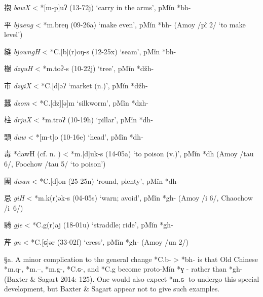 \begin{description} \item
抱  \emph{bawX} \textless{} *[m-p]{}uʔ (13-72j) `carry in the arms',
pMǐn *bh-
\item
平  \emph{bjaeng} \textless{} *m.breŋ (09-26a) `make even', pMǐn *bh-
(Amoy /p{}ĩ 2/ `to make level')
\item
縫  \emph{bjowngH} \textless{} *C.{[}b](r)oŋ-s (12-25x) `seam', pMǐn
*bh-
\item
樹 \emph{dzyuH} \textless{} *m.toʔ-s (10-22j) `tree', pMǐn *džh-
\item
市 \emph{dzyiX} \textless{} *C.{[}d]əʔ `market (n.)', pMǐn *džh-

\item
蠶 \emph{dzom} \textless{} *C.{[}dz]{}{[}ə]m `silkworm', pMǐn *dzh-

\item
柱 \emph{drjuX} \textless{} *m.troʔ (10-19h) `pillar', pMǐn *dh-

\item
頭 \emph{duw} \textless{} *[m-t]{}o (10-16e) `head', pMǐn *dh-

\item
毒 *dawH (cf. n. ) \textless{} *m.{[}d]{}uk-s (14-05a) `to poison
(v.)', pMǐn *dh (Amoy /t{}au 6/, Foochow /t{}au 5/ `to poison')

\item
團 \emph{dwan} \textless{} *C.{[}d]{}on (25-25n) `round, plenty', pMǐn
*dh-

\item
忌 \emph{giH} \textless{} *m.k(r)ək-s (04-05s) `warn; avoid', pMǐn *gh-
(Amoy /{}i 6/, Chaochow /{}i~6/)

\item
騎 \emph{gje} \textless{} *C.g(r)aj (18-01u) `straddle; ride', pMǐn *gh-

\item
芹 \emph{g{}n} \textless{} *C.{[}ɢ]ər (33-02f) `cress', pMǐn *gh-
(Amoy /{}un 2/)
\end{description}

§a. A minor complication to the general change *C.b- \textgreater{} *bh-
is that Old Chinese *m.q-, *m.{}--, *m.g{}-, *C.ɢ-, and *C.g{} become
proto-Mǐn *ɣ - rather than *gh- (Baxter \& Sagart 2014: 125). One would
also expect *m.ɢ- to undergo this special development, but Baxter \&
Sagart appear not to give such examples.

